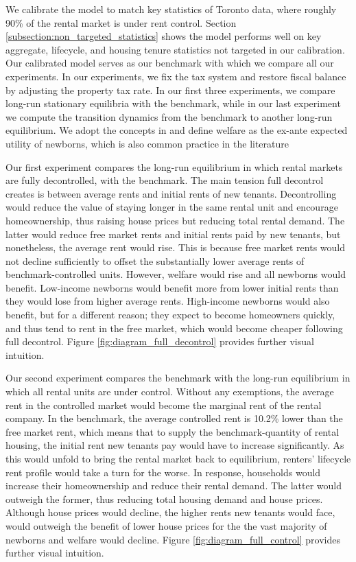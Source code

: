 \documentclass[parskip=full]{article}
\begin{document}
We calibrate the model to match key statistics of Toronto data, where roughly 90\% of the rental market is under rent control. Section \ref{subsection:non_targeted_statistics} shows the model performs well on key aggregate, lifecycle, and housing tenure statistics not targeted in our calibration. Our calibrated model serves as our benchmark with which we compare all our experiments. In our experiments, we fix the tax system and restore fiscal balance by adjusting the property tax rate. In our first three experiments, we compare long-run stationary equilibria with the benchmark, while in our last experiment we compute the transition dynamics from the benchmark to another long-run equilibrium. We adopt the concepts in \citet{ralws-1971} and define welfare as the ex-ante expected utility of newborns, which is also common practice in the literature \citep{conesa-et-al,gkkoc}

Our first experiment compares the long-run equilibrium in which rental markets are fully decontrolled, with the benchmark. The main tension full decontrol creates is between average rents and initial rents of new tenants. Decontrolling would reduce the value of staying longer in the same rental unit and encourage homeownership, thus raising house prices but reducing total rental demand. The latter would reduce free market rents and initial rents paid by new tenants, but nonetheless, the average rent would rise. This is because free market rents would not decline sufficiently to offset the substantially lower average rents of benchmark-controlled units. However, welfare would rise and all newborns would benefit. Low-income newborns would benefit more from lower initial rents than they would lose from higher average rents. High-income newborns would also benefit, but for a different reason; they expect to become homeowners quickly, and thus tend to rent in the free market, which would become cheaper following full decontrol. Figure \ref{fig:diagram_full_decontrol} provides further visual intuition.

Our second experiment compares the benchmark with the long-run equilibrium in which all rental units are under control. Without any exemptions, the average rent in the controlled market would become the marginal rent of the rental company. In the benchmark, the average controlled rent is 10.2\% lower than the free market rent, which means that to supply the benchmark-quantity of rental housing, the initial rent new tenants pay would have to increase significantly. As this would unfold to bring the rental market back to equilibrium, renters' lifecycle rent profile would take a turn for the worse. In response, households would increase their homeownership and reduce their rental demand. The latter would outweigh the former, thus reducing total housing demand and house prices. Although house prices would decline, the higher rents new tenants would face, would outweigh the benefit of lower house prices for the the vast majority of newborns and welfare would decline. Figure \ref{fig:diagram_full_control} provides further visual intuition.
\end{document}
